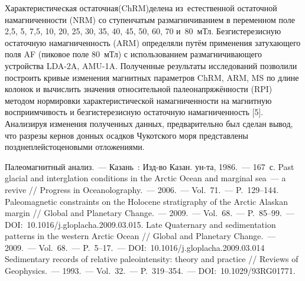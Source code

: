 Характеристическая остаточная (ChRM)\-де\-ле\-на из~ес\-тест\-вен\-ной остаточной намагниченности (NRM) со ступенчатым размагничиванием в переменном поле 2,5, 5, 7,5, 10, 20, 25, 30, 35, 40, 45, 50, 60, 70 и~80~мТл. Безгистерезисную остаточную намагниченность (ARM) определяли путём применения затухающего поля AF (пиковое поле 80~мТл) с использованием размагничивающего устройства LDA-2A, AMU-1A. Полученные результаты  исследований позволили построить кривые изменения магнитных параметров  ChRM, ARM, MS по длине колонок и вычислить значения относительной палеонапряжённости (RPI) методом нормировки характеристической намагниченности на магнитную восприимчивость и безгистерезисную остаточную намагниченность [5]. Анализируя изменения полученных данных, предварительно был сделан вывод, что разрезы кернов донных осадков Чукотского моря представлены позднеплейстоценовыми отложениями.



\begin{thebibliography}{99}
\bibitem{} Палеомагнитный анализ.~--- Казань~: Изд-во Казан. ун-та, 1986.~--- 167~с.
\bibitem{} Past glacial and interglation conditions in the Arctic Ocean and marginal sea~--- a revive // Progress in Oceanolography.~--- 2006.~--- Vol.~71.~--- P.~129--144.
\bibitem{} Paleomagnetic constraints on the Holocene stratigraphy of the Arctic Alaskan margin // Global and Planetary Change.~--- 2009.~--- Vol.~68.~--- P.~85--99.~--- DOI:~10.1016/j.gloplacha.2009.03.015.
\bibitem{} Late Quaternary and sedimentation patterns in the western Arctic Ocean // Global and Planetary Change.~--- 2009.~--- Vol.~68.~--- P.~5--17.~--- DOI:~10.1016/j.gloplacha.2009.03.014
\bibitem{} Sedimentary records of relative paleointensity: theory and practice // Reviews of Geophysics.~--- 1993.~--- Vol.~32.~--- P.~319--354.~--- DOI:~10.1029/93RG01771.

\end{thebibliography}
\thispagestyle{empty}
